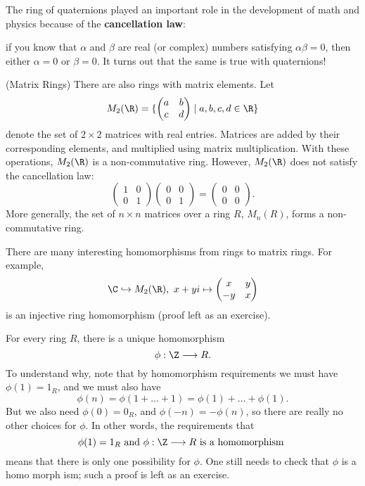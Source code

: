 \documentclass[math1530-lecture-notes]{subfiles}
\begin{document}
The ring of quaternions played an important role in the development of math and physics because of
the \textbf{cancellation law}: \begin{center}
  if you know that $\alpha$ and $\beta$ are real (or complex) numbers satisfying $\alpha\beta=0$,
  then either $ \alpha=0$ or $\beta=0$. It turns out that the same is true with quaternions!
\end{center} 

\begin{example}
  (Matrix Rings) There are also rings with matrix elements. Let \[
    M_2(\R)=\{\begin{pmatrix} a&b\\c&d \end{pmatrix} \mid a,b,c,d\in \R\} 
  \] denote the set of $2\times 2$ matrices with real entries. Matrices are added by their
  corresponding elements, and multiplied using matrix multiplication. With these operations, $
  M_2(\R)$ is a non-commutative ring. However, $ M_2(\R)$ does not satisfy the cancellation law: \[
    \begin{pmatrix} 1&0\\0&1 \end{pmatrix} \begin{pmatrix} 0&0\\0&1 \end{pmatrix} =\begin{pmatrix}
  0&0\\0&0 \end{pmatrix} 
.\] More generally, the set of $n\times n$ matrices over a ring $R$, $M_n(R)$, forms a
non-commutative ring.

There are many interesting homomorphisms from rings to matrix rings. For example, \[
  \C \hookrightarrow M_2(\R),\ x+yi\mapsto \begin{pmatrix} x&y\\-y&x \end{pmatrix}  
\] is an injective ring homomorphism (proof left as an exercise).
\end{example}

\begin{example}\label{ex21}
  For every ring $R$, there is a unique homomorphism \[
    \phi:\Z\longrightarrow R
  .\] To understand why, note that by homomorphism requirements we must have $\phi(1)=1_R$, and we
  must also have \[
    \phi(n)=\phi(1+\ldots+1)=\phi(1)+\ldots+\phi(1)
  .\] But we also need $\phi(0)=0_R$, and $\phi(-n)=-\phi(n)$, so there are really no other choices
  for $\phi$. In other words, the requirements that \[
    \phi(1)=1_R ~\text{and}~ \phi:\Z\longrightarrow R ~\text{is a homomorphism}~
  \] means that there is only one possibility for $\phi$. One still needs to check that $ \phi$ is a
  homo morph ism; such a proof is left as an exercise.
\end{example}
\end{document}
